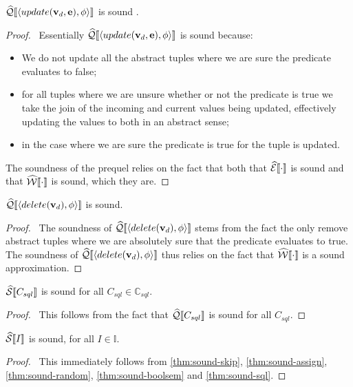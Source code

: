\begin{conjecture}\label{thm:sound-update}
    $\widehat{\mathcal{Q}}\llbracket \langle update(\mathbf{v}_d, \mathbf{e}), \phi \rangle \rrbracket$ is sound .
\end{conjecture}
\begin{proof}
    \pfsketch\
    Essentially $\widehat{\mathcal{Q}}\llbracket \langle update(\mathbf{v}_d, \mathbf{e}), \phi \rangle \rrbracket$ is sound because:
    \begin{itemize}
        \item We do not update all the abstract tuples where we are sure the predicate evaluates to false;
        \item for all tuples where we are unsure whether or not the predicate is true we take the join of the incoming and current values being updated, effectively updating the values to both in an abstract sense;
        \item in the case where we are sure the predicate is true for the tuple is updated.
    \end{itemize}
    The soundness of the prequel relies on the fact that both that $\widehat{\mathcal{E}}\llbracket \cdot \rrbracket$ is sound and that $\widehat{\mathcal{W}}\llbracket \cdot \rrbracket$ is sound, which they are.
\end{proof}

\begin{conjecture}\label{thm:sound-update}
    $\widehat{\mathcal{Q}}\llbracket \langle delete(\mathbf{v}_d), \phi \rangle \rrbracket$ is sound.
\end{conjecture}
\begin{proof}
    \pfsketch\
    The soundness of $\widehat{\mathcal{Q}}\llbracket \langle delete(\mathbf{v}_d), \phi \rangle \rrbracket$ stems from the fact the only remove abstract tuples where we are absolutely sure that the predicate evaluates to true.
    The soundness of $\widehat{\mathcal{Q}}\llbracket \langle delete(\mathbf{v}_d), \phi \rangle \rrbracket$ thus relies on the fact that $\widehat{\mathcal{W}}\llbracket \cdot \rrbracket$ is a sound approximation.
\end{proof}

\begin{conjecture}\label{thm:sound-sql}
    $\widehat{\mathcal{S}} \llbracket C_{sql} \rrbracket$ is sound for all $C_{sql} \in \mathbb{C}_{sql}$.
\end{conjecture}
\begin{proof}
    \pf\
    This follows from the fact that $\widehat{\mathcal{Q}}\llbracket C_{sql} \rrbracket$ is sound for all $C_{sql}$.
\end{proof}

\begin{conjecture}
    $\widehat{\mathcal{S}} \llbracket I \rrbracket$ is sound, for all $I \in \mathbb{I}$.
\end{conjecture}
\begin{proof}
    \pf\
    This immediately follows from \autoref{thm:sound-skip}, \ref{thm:sound-assign}, \ref{thm:sound-random}, \ref{thm:sound-boolsem} and \ref{thm:sound-sql}.
\end{proof}
